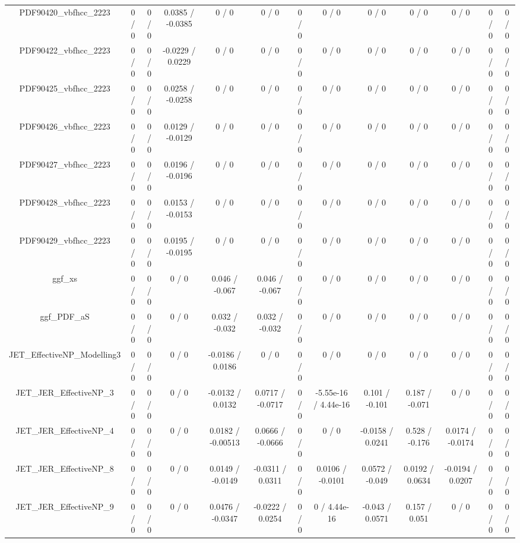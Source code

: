 \documentclass[10pt]{article}
\begin{document}
\begin{table}[htbp]
\begin{center}
\begin{tabular}{|c|c|c|c|c|c|c|c|c|c|c|c|c|}
  PDF90420_vbfhcc_2223 & 0 / 0 & 0 / 0 & 0.0385 / -0.0385 & 0 / 0 & 0 / 0 & 0 / 0 & 0 / 0 & 0 / 0 & 0 / 0 & 0 / 0 & 0 / 0 & 0 / 0 \\ 
  PDF90422_vbfhcc_2223 & 0 / 0 & 0 / 0 & -0.0229 / 0.0229 & 0 / 0 & 0 / 0 & 0 / 0 & 0 / 0 & 0 / 0 & 0 / 0 & 0 / 0 & 0 / 0 & 0 / 0 \\ 
  PDF90425_vbfhcc_2223 & 0 / 0 & 0 / 0 & 0.0258 / -0.0258 & 0 / 0 & 0 / 0 & 0 / 0 & 0 / 0 & 0 / 0 & 0 / 0 & 0 / 0 & 0 / 0 & 0 / 0 \\ 
  PDF90426_vbfhcc_2223 & 0 / 0 & 0 / 0 & 0.0129 / -0.0129 & 0 / 0 & 0 / 0 & 0 / 0 & 0 / 0 & 0 / 0 & 0 / 0 & 0 / 0 & 0 / 0 & 0 / 0 \\ 
  PDF90427_vbfhcc_2223 & 0 / 0 & 0 / 0 & 0.0196 / -0.0196 & 0 / 0 & 0 / 0 & 0 / 0 & 0 / 0 & 0 / 0 & 0 / 0 & 0 / 0 & 0 / 0 & 0 / 0 \\ 
  PDF90428_vbfhcc_2223 & 0 / 0 & 0 / 0 & 0.0153 / -0.0153 & 0 / 0 & 0 / 0 & 0 / 0 & 0 / 0 & 0 / 0 & 0 / 0 & 0 / 0 & 0 / 0 & 0 / 0 \\ 
  PDF90429_vbfhcc_2223 & 0 / 0 & 0 / 0 & 0.0195 / -0.0195 & 0 / 0 & 0 / 0 & 0 / 0 & 0 / 0 & 0 / 0 & 0 / 0 & 0 / 0 & 0 / 0 & 0 / 0 \\ 
  ggf_xs & 0 / 0 & 0 / 0 & 0 / 0 & 0.046 / -0.067 & 0.046 / -0.067 & 0 / 0 & 0 / 0 & 0 / 0 & 0 / 0 & 0 / 0 & 0 / 0 & 0 / 0 \\ 
  ggf_PDF_aS & 0 / 0 & 0 / 0 & 0 / 0 & 0.032 / -0.032 & 0.032 / -0.032 & 0 / 0 & 0 / 0 & 0 / 0 & 0 / 0 & 0 / 0 & 0 / 0 & 0 / 0 \\ 
  JET_EffectiveNP_Modelling3 & 0 / 0 & 0 / 0 & 0 / 0 & -0.0186 / 0.0186 & 0 / 0 & 0 / 0 & 0 / 0 & 0 / 0 & 0 / 0 & 0 / 0 & 0 / 0 & 0 / 0 \\ 
  JET_JER_EffectiveNP_3 & 0 / 0 & 0 / 0 & 0 / 0 & -0.0132 / 0.0132 & 0.0717 / -0.0717 & 0 / 0 & -5.55e-16 / 4.44e-16 & 0.101 / -0.101 & 0.187 / -0.071 & 0 / 0 & 0 / 0 & 0 / 0 \\ 
  JET_JER_EffectiveNP_4 & 0 / 0 & 0 / 0 & 0 / 0 & 0.0182 / -0.00513 & 0.0666 / -0.0666 & 0 / 0 & 0 / 0 & -0.0158 / 0.0241 & 0.528 / -0.176 & 0.0174 / -0.0174 & 0 / 0 & 0 / 0 \\ 
  JET_JER_EffectiveNP_8 & 0 / 0 & 0 / 0 & 0 / 0 & 0.0149 / -0.0149 & -0.0311 / 0.0311 & 0 / 0 & 0.0106 / -0.0101 & 0.0572 / -0.049 & 0.0192 / 0.0634 & -0.0194 / 0.0207 & 0 / 0 & 0 / 0 \\ 
  JET_JER_EffectiveNP_9 & 0 / 0 & 0 / 0 & 0 / 0 & 0.0476 / -0.0347 & -0.0222 / 0.0254 & 0 / 0 & 0 / 4.44e-16 & -0.043 / 0.0571 & 0.157 / 0.051 & 0 / 0 & 0 / 0 & 0 / 0 \\ 

\end{tabular}
\end{center}
\end{table}
\end{document}
